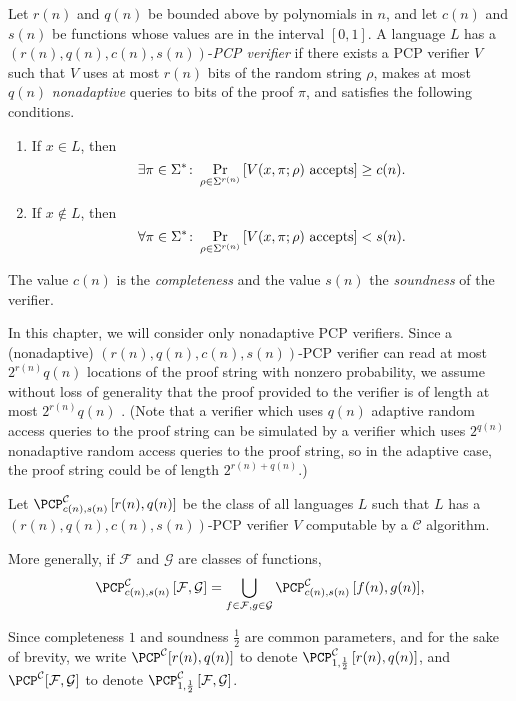 \begin{definition}
  Let $r(n)$ and $q(n)$ be bounded above by polynomials in $n$, and let $c(n)$ and $s(n)$ be functions whose values are in the interval $[0, 1]$.
  A language $L$ has a $(r(n), q(n), c(n), s(n))$-\emph{PCP verifier} if there exists a PCP verifier $V$ such that $V$ uses at most $r(n)$ bits of the random string $\rho$, makes at most $q(n)$ \emph{nonadaptive} queries to bits of the proof $\pi$, and satisfies the following conditions.
  \begin{enumerate}
  \item If $x \in L$, then
    \begin{equation*}
      \exists \pi \in \Sigma^* \colon \Pr_{\rho \in \Sigma^{r(n)}}{\left[V(x, \pi; \rho) \textnormal{ accepts}\right]} \geq c(n).
    \end{equation*}
  \item If $x \notin L$, then
    \begin{equation*}
      \forall \pi \in \Sigma^* \colon \Pr_{\rho \in \Sigma^{r(n)}}{\left[V(x, \pi; \rho) \textnormal{ accepts}\right]} < s(n).
    \end{equation*}
  \end{enumerate}
  The value $c(n)$ is the \emph{completeness} and the value $s(n)$ the \emph{soundness} of the verifier.
\end{definition}

In this chapter, we will consider only nonadaptive PCP verifiers.
Since a (nonadaptive) $(r(n), q(n), c(n), s(n))$-PCP verifier can read at most $2^{r(n)} q(n)$ locations of the proof string with nonzero probability, we assume without loss of generality that the proof provided to the verifier is of length at most $2^{r(n)} q(n)$ \autocite[Remark~11.6]{ab09}.
(Note that a verifier which uses $q(n)$ adaptive random access queries to the proof string can be simulated by a verifier which uses $2^{q(n)}$ nonadaptive random access queries to the proof string, so in the adaptive case, the proof string could be of length $2^{r(n) + q(n)}$.)

\begin{definition}
  Let $\PCPcs{\mathcal{C}}{c(n)}{s(n)}{r(n)}{q(n)}$ be the class of all languages $L$ such that $L$ has a $(r(n), q(n), c(n), s(n))$-PCP verifier $V$ computable by a $\mathcal{C}$ algorithm.

  More generally, if $\mathcal{F}$ and $\mathcal{G}$ are classes of functions,
  \begin{equation*}
    \PCPcs{\mathcal{C}}{c(n)}{s(n)}{\mathcal{F}}{\mathcal{G}} = \bigcup_{f \in \mathcal{F}, g \in \mathcal{G}}{\PCPcs{\mathcal{C}}{c(n)}{s(n)}{f(n)}{g(n)}},
    \end{equation*}

  Since completeness $1$ and soundness $\frac{1}{2}$ are common parameters, and for the sake of brevity, we write $\PCP^{\mathcal{C}}[r(n), q(n)]$ to denote $\PCPcs{\mathcal{C}}{1}{\frac{1}{2}}{r(n)}{q(n)}$, and $\PCP^{\mathcal{C}}[\mathcal{F}, \mathcal{G}]$ to denote $\PCPcs{\mathcal{C}}{1}{\frac{1}{2}}{\mathcal{F}}{\mathcal{G}}$.
\end{definition}


